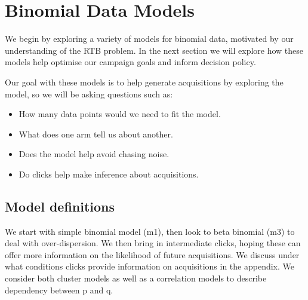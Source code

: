 \documentclass[11pt,a4,singlespacing,titlepagenumber=on]{scrreprt}
\numberwithin{equation}{chapter} %
\theoremstyle{remark}
\begin{document}
\chapter{Binomial Data Models}

We begin by exploring a variety of models for binomial data, motivated by our understanding of the RTB problem. In the next section we will explore how these models help optimise our campaign goals and inform decision policy.

Our goal with these models is to help generate acquisitions by exploring the model, so we will be asking questions such as:
\begin{itemize}
	\item How many data points would we need to fit the model.
	\item What does one arm tell us about another.
	\item Does the model help avoid chasing noise.
	\item Do clicks help make inference about acquisitions.
\end{itemize}





\section{Model definitions} 


We start with simple binomial model (m1), then look to beta binomial (m3) to deal with over-dispersion. We then bring in intermediate clicks, hoping these can offer more information on the likelihood of future acquisitions. We discuss under what conditions clicks provide information on acquisitions in the appendix. We consider both cluster models as well as a correlation models to describe dependency between p and q.
\end{document}
